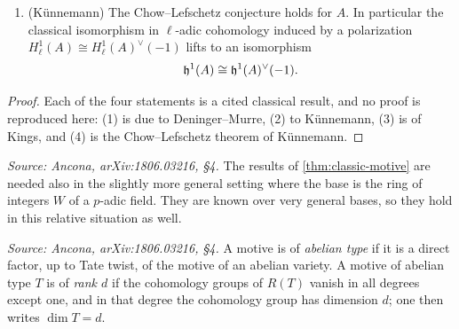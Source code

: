\begin{theorem}
\begin{enumerate}
      naturality in (1) induces an injective morphism of algebras
      \[\End(A) \otimes_{\Z} F \hookrightarrow \End_{\CHM(k)_{F}}(\hh^1(A)),\]
      and if \(A\) is isogenous to \(B \times C\) then
      \(\hh^1(A) = \hh^1(B) \oplus \hh^1(C)\).
    \item (K\"unnemann) The Chow--Lefschetz conjecture holds for \(A\). In
      particular the classical isomorphism in \(\ell\)-adic cohomology induced by
      a polarization \(H_{\ell}^1(A) \cong H_{\ell}^1(A)^{\vee}(-1)\) lifts to an
      isomorphism
      \[\mathfrak{h}^1(A) \cong \mathfrak{h}^1(A)^{\vee}(-1).\]
  \end{enumerate}
\end{theorem}

\begin{proof}
  Each of the four statements is a cited classical result, and no proof is
  reproduced here: (1) is due to Deninger--Murre, (2) to K\"unnemann, (3) is
  \cite[Proposition 2.2.1]{Ki} of Kings, and (4) is the Chow--Lefschetz theorem
  of K\"unnemann.
\end{proof}

\begin{remark}
  \label{rem:AHP}
  \textit{Source: Ancona, arXiv:1806.03216, §4.}
  The results of \cref{thm:classic-motive} are needed also in the slightly more
  general setting where the base is the ring of integers \(W\) of a \(p\)-adic
  field. They are known over very general bases, so they hold in this relative
  situation as well.
\end{remark}

\begin{definition}
  \label{def:abelian-type-rank}
  \textit{Source: Ancona, arXiv:1806.03216, §4.}
  A motive is of \emph{abelian type} if it is a direct factor, up to Tate twist,
  of the motive of an abelian variety. A motive of abelian type \(T\) is of
  \emph{rank \(d\)} if the cohomology groups of \(R(T)\) vanish in all degrees
  except one, and in that degree the cohomology group has dimension \(d\); one
  then writes \(\dim T = d\).
\end{definition}

